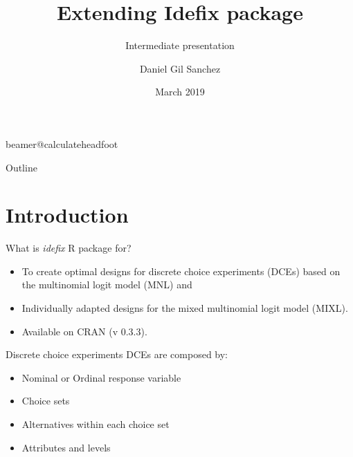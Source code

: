 \documentclass[11pt,t]{beamer}
\title[Extending Idefix package]{Extending Idefix package} %
\subtitle{Intermediate presentation}
\author{Daniel Gil Sanchez}
\institute{KU Leuven}
\date{March 2019}
\begin{document}
\csname beamer@calculateheadfoot\endcsname %


\begin{frame}
	\titlepage
\end{frame}
	

\begin{frame}{Outline}
	\hfill	{\large \parbox{.961\textwidth}{\tableofcontents[hideothersubsections]}}
\end{frame}

\section{Introduction}
\begin{frame}[fragile]{What is \textit{idefix} R package for?}
	\begin{itemize}
		\item To create optimal designs for discrete choice experiments (DCEs) based on the multinomial logit model (MNL) and
		\item Individually adapted designs for the mixed multinomial logit model (MIXL).
		\item Available on CRAN (v 0.3.3).
	\end{itemize}	
	\begin{block}{Discrete choice experiments}
		DCEs are composed by:
		\begin{itemize}
			\item Nominal or Ordinal response variable
			\item Choice sets 
			\item Alternatives within each choice set
			\item Attributes and levels
		\end{itemize}
	\end{block}
\end{frame}
\end{document}

